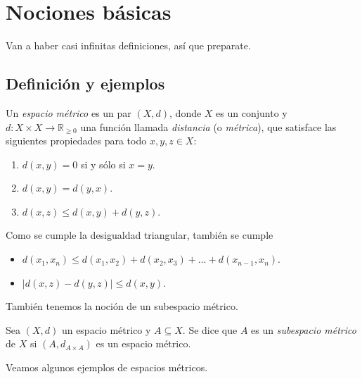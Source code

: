 \chapter{Nociones básicas}

Van a haber casi infinitas definiciones, así que preparate.

\section{Definición y ejemplos}

\begin{definition}
	Un \emph{espacio métrico} es un par $(X, d)$, donde $X$ es un conjunto y $d: X \times X \to \mathbb{R}_{\geq 0}$ una función llamada \emph{distancia} (o \emph{métrica}), que satisface las siguientes propiedades para todo $x, y, z \in X$:
	\begin{enumerate}
		\item $d(x, y) = 0$ si y sólo si $x = y$.
		\item $d(x, y) = d(y, x)$.
		\item $d(x, z) \leq  d(x, y) + d(y, z)$.
	\end{enumerate}
\end{definition}

\begin{remark}
	Como se cumple la desigualdad triangular, también se cumple
	\begin{itemize}
		\item $d(x_{1}, x_{n}) \leq d(x_{1}, x_{2}) + d(x_{2}, x_{3}) + \dots + d(x_{n-1}, x_{n})$.
		\item $\lvert d(x, z) - d(y, z) \rvert \leq d(x, y)$.
	\end{itemize}
\end{remark}

También tenemos la noción de un subespacio métrico.

\begin{definition}
	Sea $(X, d)$ un espacio métrico y $A \subseteq X$. Se dice que $A$ es un \emph{subespacio métrico} de $X$ si $(A, d_{A \times A})$ es un espacio métrico.
\end{definition}

Veamos algunos ejemplos de espacios métricos.

